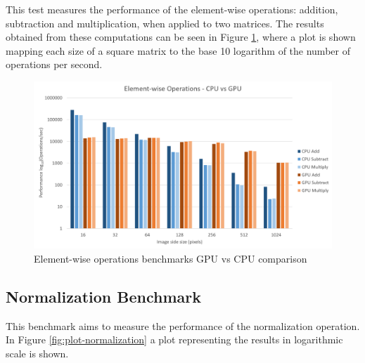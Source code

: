       This test measures the performance of the element-wise operations: addition, subtraction and multiplication, when applied to two matrices. The results obtained from these computations can be seen in Figure \ref{fig:plot-ewops}, where a plot is shown mapping each size of a square matrix to the base 10 logarithm of the number of operations per second. 
    
      \begin{figure}[H]
      	\centering
      	\includegraphics[width=\plotwidth]{images/results/benchmarks/plot-ewops}
      	\caption{Element-wise operations benchmarks GPU vs CPU comparison}
      	\label{fig:plot-ewops}
      \end{figure}
    
    \subsection{Normalization Benchmark}
    
      This benchmark aims to measure the performance of the normalization operation. In Figure \ref{fig:plot-normalization} a plot representing the results in logarithmic scale is shown. 
    
